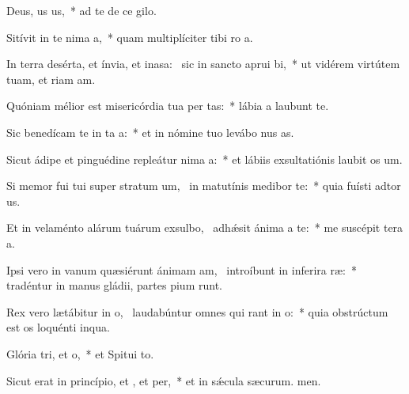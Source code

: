\item Deus, us us,~* ad te de ce gilo.
\item Sitívit in te nima a,~* quam multiplíciter tibi ro a.
\item In terra desérta, et ínvia, et inasa:~\pscross{} sic in sancto aprui bi,~* ut vidérem virtútem tuam, et riam am.
\item Quóniam mélior est misericórdia tua per tas:~* lábia a laubunt te.
\item Sic benedícam te in ta a:~* et in nómine tuo levábo nus as.
\item Sicut ádipe et pinguédine repleátur nima a:~* et lábiis exsultatiónis laubit os um.
\item Si memor fui tui super stratum um,~\pscross{} in matutínis medibor  te:~* quia fuísti adtor us.
\item Et in velaménto alárum tuárum exsulbo,~\pscross{} adhǽsit ánima a  te:~* me suscépit tera a.
\item Ipsi vero in vanum quæsiérunt ánimam am,~\pscross{} introíbunt in inferira ræ:~* tradéntur in manus gládii, partes pium runt.
\item Rex vero lætábitur in o,~\pscross{} laudabúntur omnes qui rant in o:~* quia obstrúctum est os loquénti inqua.
\item Glória tri, et o,~* et Spitui to.
\item Sicut erat in princípio, et , et per,~* et in sǽcula sæcurum. men.
